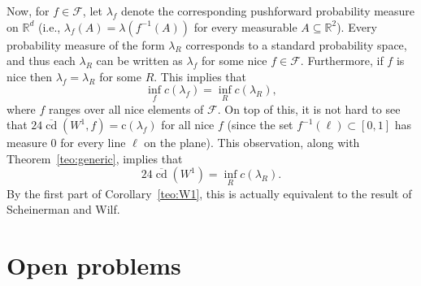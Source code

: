 \documentclass{article}
\begin{document}
Now, for $f\in\mathcal{F}$, let $\lambda_f$ denote the corresponding pushforward probability measure on $\mathbb{R}^d$ (i.e., $\lambda_f(A)=\lambda(f^{-1}(A))$ for every measurable $A\subseteq\mathbb{R}^2$). Every probability measure of the form $\lambda_R$ corresponds to a standard probability space, and thus each $\lambda_R$ can be written as $\lambda_f$ for some nice $f\in\mathcal{F}$. Furthermore, if $f$ is nice then $\lambda_f=\lambda_R$ for some $R$. This implies that \[\inf_{f}c(\lambda_f)=\inf_{R}c(\lambda_R),\] where $f$ ranges over all nice elements of $\mathcal{F}$. On top of this, it is not hard to see that $24\overline{\mathop{\mathrm{cd}}}(W^1,f)=\text{c}(\lambda_f)$ for all nice $f$ (since the set $f^{-1}(\ell)\subset[0,1]$ has measure $0$ for every line $\ell$ on the plane). This observation, along with Theorem~\ref{teo:generic}, implies that \[24\overline{\mathop{\mathrm{cd}}}(W^1)=\inf_{R}c(\lambda_R).\] By the first part of Corollary~\ref{teo:W1}, this is actually equivalent to the result of Scheinerman and Wilf.

\section{Open problems}\label{sec:final}
\end{document}
